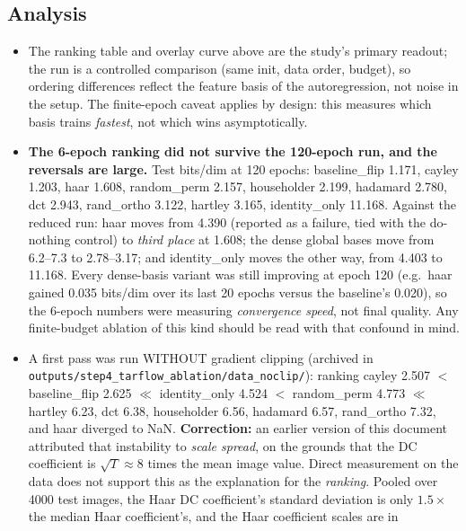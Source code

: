 \documentclass[11pt]{article}
\begin{document}
\subsection{Analysis}
\label{sec:step4analysis}
\begin{itemize}
  \item The ranking table and overlay curve above are the study's primary
        readout; the run is a controlled comparison (same init, data order,
        budget), so ordering differences reflect the feature basis of the
        autoregression, not noise in the setup. The finite-epoch caveat
        applies by design: this measures which basis trains \emph{fastest},
        not which wins asymptotically.
  \item \textbf{The 6-epoch ranking did not survive the 120-epoch run, and
        the reversals are large.} Test bits/dim at 120 epochs:
        baseline\_flip 1.171, cayley 1.203, haar 1.608, random\_perm 2.157,
        householder 2.199, hadamard 2.780, dct 2.943, rand\_ortho 3.122,
        hartley 3.165, identity\_only 11.168. Against the reduced run:
        haar moves from 4.390 (reported as a failure, tied with the
        do-nothing control) to \emph{third place} at 1.608; the dense
        global bases move from 6.2--7.3 to 2.78--3.17; and identity\_only
        moves the other way, from 4.403 to 11.168. Every dense-basis
        variant was still improving at epoch 120 (e.g.\ haar gained 0.035
        bits/dim over its last 20 epochs versus the baseline's 0.020), so
        the 6-epoch numbers were measuring \emph{convergence speed}, not
        final quality. Any finite-budget ablation of this kind should be
        read with that confound in mind.
  \item A first pass was run WITHOUT gradient clipping (archived in
        \texttt{outputs/step4\_tarflow\_ablation/data\_noclip/}): ranking
        cayley 2.507 $<$ baseline\_flip 2.625 $\ll$ identity\_only 4.524 $<$
        random\_perm 4.773 $\ll$ hartley 6.23, dct 6.38, householder 6.56,
        hadamard 6.57, rand\_ortho 7.32, and haar diverged to NaN.
        \textbf{Correction:} an earlier version of this document attributed
        that instability to \emph{scale spread}, on the grounds that the DC
        coefficient is $\sqrt{T}\approx 8$ times the mean image value.
        Direct measurement on the data does not support this as the
        explanation for the \emph{ranking}. Pooled over 4000 test images,
        the Haar DC coefficient's standard deviation is only $1.5\times$ the
        median Haar coefficient's, and the Haar coefficient scales are in

\end{itemize}
\end{document}

